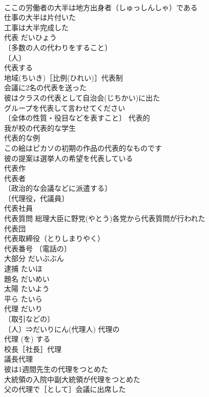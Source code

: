 \documentclass[8pt]{extreport}
\begin{document}
\begin{CJK}{UTF8}{min}
\\	ここの労働者の大半は地方出身者（しゅっしんしゃ）である 
\\	仕事の大半は片付いた 
\\	工事は大半完成した 
\\	代表	だいひょう	
\\	〔多数の人の代わりをすること〕
\\	〔人〕
\\	代表する 
\\	地域(ちいき)［比例(ひれい)］代表制 
\\	会議に2名の代表を送った 
\\	彼はクラスの代表として自治会(じちかい)に出た 
\\	グループを代表して言わせてください 
\\	〔全体の性質・役目などを表すこと〕 代表的 
\\	我が校の代表的な学生 
\\	代表的な例 
\\	この絵はピカソの初期の作品の代表的なものです 
\\	彼の提案は選挙人の希望を代表している 
\\	代表作 
\\	代表者 
\\	〔政治的な会議などに派遣する〕
\\	〔代理役，代議員〕
\\	代表社員 
\\	代表質問 総理大臣に野党(やとう)各党から代表質問が行われた 
\\	代表団 
\\	代表取締役（とりしまりやく） 
\\	代表番号 〔電話の〕
\\	大部分	だいぶぶん	
\\	逮捕	たいほ	
\\	題名	だいめい	
\\	太陽	たいよう	
\\	平ら	たいら	
\\	代理	だいり	
\\	〔取引などの〕
\\	〔人〕⇒だいりにん(代理人) 代理の 
\\	代理 (を) する 
\\	校長［社長］代理 
\\	議長代理 
\\	彼は1週間先生の代理をつとめた 
\\	大統領の入院中副大統領が代理をつとめた 
\\	父の代理で［として］会議に出席した 

\end{CJK}
\end{document}
